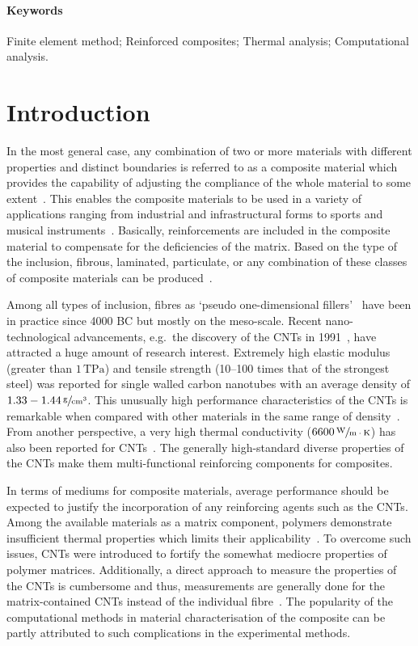 \paragraph{Keywords} Finite element method; Reinforced composites; Thermal analysis; Computational analysis.


\section{Introduction}
	In the most general case, any combination of two or more materials with different properties and distinct boundaries is referred to as a composite material which provides the capability of adjusting the compliance of the whole material to some extent~\autocite{Vasiliev.2013}. This enables the composite materials to be used in a variety of applications ranging from industrial and infrastructural forms to sports and musical instruments~\autocite{Vinson.2002}. Basically, reinforcements are included in the composite material to compensate for the deficiencies of the matrix. Based on the type of the inclusion, fibrous, laminated, particulate, or any combination of these classes of composite materials can be produced~\autocite{Jones.1999}.
	
	Among all types of inclusion, fibres as `pseudo one-dimensional fillers'~\autocite{Coleman.2006} have been in practice since 4000 BC but mostly on the meso-scale. Recent nano-technological advancements, e.g.~the discovery of the CNTs in 1991~\autocite{Iijima.1991}, have attracted a huge amount of research interest. Extremely high elastic modulus (greater than $1\,\text{TPa}$) and tensile strength (10--100 times that of the strongest steel) was reported for single walled carbon nanotubes with an average density of $1.33-1.44\,\sfrac{\text{g}}{\text{cm}^3}$. This unusually high performance characteristics of the CNTs is remarkable when compared with other materials in the same range of density~\autocite{Thostenson.2001,Thostenson.2005}. From another perspective, a very high thermal conductivity ($6600\,\sfrac{\text{W}}{\text{m}\cdot\text{K}}$) has also been reported for CNTs~\autocite{Berber.2000,Han.2011b,Behabtu.2013,Baughman.2002}. The generally high-standard diverse properties of the CNTs make them multi-functional reinforcing components for composites.
	
	In terms of mediums for composite materials, average performance should be expected to justify the incorporation of any reinforcing agents such as the CNTs. Among the available materials as a matrix component, polymers demonstrate insufficient thermal properties which limits their applicability~\autocite{Han.2011b}. To overcome such issues, CNTs were introduced to fortify the somewhat mediocre properties of polymer matrices. Additionally, a direct approach to measure the properties of the CNTs is cumbersome and thus, measurements are generally done for the matrix-contained CNTs instead of the individual fibre~\autocite{Ruoff.1995}. The popularity of the computational methods in material characterisation of the composite can be partly attributed to such complications in the experimental methods.
	
